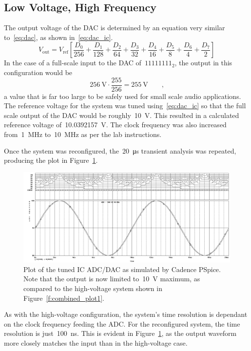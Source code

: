 \subsection{Low Voltage, High Frequency}
The output voltage of the DAC is determined by an equation very similar
to~\eqref{eq:dac}, as shown in~\eqref{eq:dac_ic}.
%
\begin{equation}
	V_\text{out} = V_\text{ref} \left[
		\frac{D_0}{256} +
		\frac{D_1}{128} +
		\frac{D_2}{64}  +
		\frac{D_3}{32}  +
		\frac{D_4}{16}  +
		\frac{D_5}{8}   +
		\frac{D_6}{4}   +
		\frac{D_7}{2} \right]
	\label{eq:dac_ic}
\end{equation}
%
In the case of a full-scale input to the DAC of~$11111111_2$, the output in
this configuration would be
%
\begin{equation*}
	\SI{256}{\volt} \cdot \frac{255}{256} = \SI{255}{\volt} \qquad \text{,}
\end{equation*}
%
a value that is far too large to be safely used for small
scale audio applications.  The reference voltage for the system was tuned
using~\eqref{eq:dac_ic} so that the full scale output of the DAC would be
roughly~\SI{10}{\volt}.  This resulted in a calculated reference voltage
of~\SI{10.0392157}{\volt}.  The clock frequency was also increased
from~\SI{1}{\mega\hertz} to~\SI{10}{\mega\hertz} as per the lab instructions.

Once the system was reconfigured, the~\SI{20}{\micro\second} transient analysis
was repeated, producing the plot in Figure~\ref{f:combined_plot2}.
%
\begin{figure}[H]
\centering
	\includegraphics[width=.8\textwidth]{img/plot/part3_plot2.PNG}
	\parbox{.8\textwidth}{
	\caption[Integrated Circuit --- Tuned Results]{Plot of the tuned IC ADC/DAC
	as simulated by Cadence PSpice.  Note that the output is now limited
	to~\SI{10}{\volt} maximum, as compared to the high-voltage system shown in
	Figure~\ref{f:combined_plot1}.}
	\label{f:combined_plot2}}
\end{figure}
%
As with the high-voltage configuration, the system's time resolution is
dependant on the clock frequency feeding the ADC.  For the reconfigured system,
the time resolution is just~\SI{100}{\nano\second}.  This is evident in
Figure~\ref{f:combined_plot2}, as the output waveform more closely matches the
input than in the high-voltage case.
